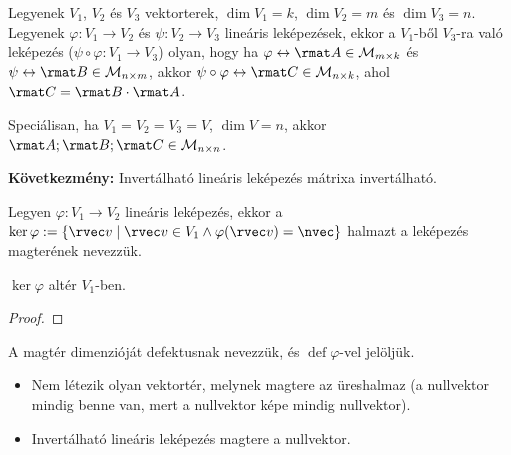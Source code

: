 \begin{statement}
  Legyenek $V_1$, $V_2$ és $V_3$ vektorterek, $\dim V_1 = k$, $\dim V_2 = m$ és
  $\dim V_3 = n$. Legyenek $\varphi: V_1 \rightarrow V_2$ és $\psi: V_2
    \rightarrow V_3$ lineáris leképezések, ekkor a $V_1$-ből $V_3$-ra való
  leképezés ($\psi \circ \varphi: V_1 \rightarrow V_3$) olyan, hogy ha
  $\varphi \leftrightarrow \rmat A \in \mathcal M_{m \times k}$ és
  $\psi \leftrightarrow \rmat B \in \mathcal M_{n \times m}$, akkor
  $\psi \circ \varphi \leftrightarrow \rmat C \in \mathcal M_{n \times k}$, ahol
  $\rmat C = \rmat B \cdot \rmat A$.

  Speciálisan, ha $V_1 = V_2 = V_3 = V$, $\dim V = n$, akkor
  $\rmat A; \rmat B; \rmat C \in \mathcal M_{n \times n}$.

  {\sffamily\bfseries Következmény:}
  Invertálható lineáris leképezés mátrixa invertálható.
\end{statement}

\begin{definition}
  Legyen $\varphi: V_1 \rightarrow V_2$ lineáris leképezés, ekkor a
  $\ker \varphi := \{ \rvec v \; | \; \rvec v \in V_1 \land \varphi(\rvec v) =
    \nvec \}$ halmazt a leképezés magterének nevezzük.
\end{definition}

\begin{statement}
  $\ker \varphi$ altér $V_1$-ben.

  \begin{proof}
    \vspace{6em}
  \end{proof}
\end{statement}

\begin{definition}
  A magtér dimenzióját defektusnak nevezzük, és $\operatorname{def} \varphi$-vel
  jelöljük.
\end{definition}

\begin{note}
  \begin{itemize}
    \item Nem létezik olyan vektortér, melynek magtere az üreshalmaz (a
          nullvektor mindig benne van, mert a nullvektor képe mindig nullvektor).

    \item Invertálható lineáris leképezés magtere a nullvektor.
  \end{itemize}
\end{note}

